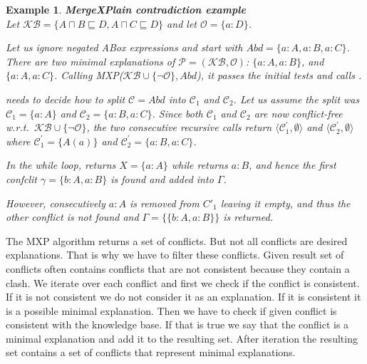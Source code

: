 \documentclass[12pt,a4paper]{article}
\newtheorem{example}{Example}[subsection]
\begin{document}
\begin{example}{\textbf{MergeXPlain contradiction example}}
	\label{example:mxpContradiction}
	\\
	Let $\mathcal{KB} = \{ A \sqcap B \sqsubseteq D, A \sqcap C \sqsubseteq D\}$ and let $\mathcal{O} = \{ a:D \}$. 
	
	Let us ignore negated ABox expressions and start with $Abd = \{ a:A, a:B,
	a:C \}$. There are two minimal explanations of $\mathcal{P} = (\mathcal{KB}, \mathcal{O})$: $\{ a:A, a:B \}$, and	$\{ a:A, a:C \}$. Calling MXP($\mathcal{KB} \cup \{\neg \mathcal{O}\}, Abd$), it passes the
	initial tests and calls .
	
	 needs to decide how to split $\mathcal{C} = Abd$ into $\mathcal{C}_{1}$
	and $\mathcal{C}_{2}$. Let us assume the split was $\mathcal{C}_{1} = \{ a:A \}$ and $\mathcal{C}_{2} =
	\{ a:B, a:C \}$. Since both $\mathcal{C}_{1}$ and $\mathcal{C}_{2}$ are now conflict-free w.r.t.\
	$\mathcal{KB} \cup \{\neg \mathcal{O}\}$, the two consecutive recursive calls return
	$\langle \mathcal{C}^{\prime}_{1},\emptyset \rangle$ and $\langle \mathcal{C}^{\prime}_{2},\emptyset \rangle$ where
	$\mathcal{C}^{\prime}_{1}=\{A(a)\}$ and $\mathcal{C}^{\prime}_{2}=\{ a:B, a:C \}$.
	
	In the while loop, \Call{getConflict}{$\mathcal{KB} \cup \{\neg \mathcal{O}\}\cup
		\{a:B,a:C\},$ $\{a:B,a:C\},$ $\{a:A\}$} returns $X = \{a:A\}$ while
	 returns $a:B$, and hence the first
	confclit $\gamma = \{b:A,a:B\}$ is found and added into $\Gamma$.
	
	However, consecutively $a:A$ is removed from $C'_1$ leaving it empty,
	and thus the other conflict is not found and $\Gamma = \{\{b:A,a:B\}\}$ is
	returned.	
\end{example}

The MXP algorithm returns a set of conflicts. But not all conflicts are desired explanations. That is why we have to filter these conflicts. Given result set of conflicts often contains conflicts that are not consistent because they contain a clash. We iterate over each conflict and first we check if the conflict is consistent. If it is not consistent we do not consider it as an explanation. If it is consistent it is a possible minimal explanation. Then we have to check if given conflict is consistent with the knowledge base. If that is true we say that the conflict is a minimal explanation and add it to the resulting set. After iteration the resulting set contains a set of conflicts that represent minimal explanations.
\end{document}
